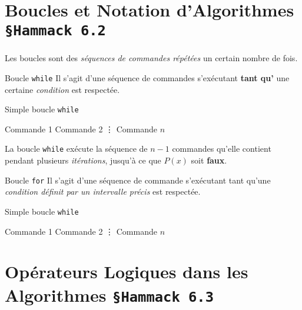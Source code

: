 \documentclass[16pt]{report}
\begin{document}
\begin{multicols*}{2}
            \section{Boucles et Notation d'Algorithmes \texttt{\small{\S Hammack 6.2}}}
                \paragraph{}
                Les boucles sont des \textit{séquences de commandes répétées} un certain nombre de fois. 

                \begin{Definitionx}{Boucle \texttt{while}}{}
                    Il s'agit d'une séquence de commandes s'exécutant \textbf{tant qu'} une 
                    certaine \textit{condition}
                    est respectée. 
                \end{Definitionx}


                \begin{algorithm}[H]
                    \caption{Simple boucle \texttt{while}}\label{alg:two}
                     {
                        Commande 1\; 
                        Commande 2\;
                        \vdots
                        Commande $n$ \;
                    }
                \end{algorithm}
                \noindent
                La boucle \texttt{while} exécute la séquence de $n - 1$ commandes qu'elle contient 
                pendant plusieurs \textit{itérations}, jusqu'à ce que $P(x)$ soit \textbf{faux}.    

            \begin{Definitionx}{Boucle \texttt{for}}{}
               Il s'agit d'une séquence de commande s'exécutant tant qu'une 
               \textit{condition définit par un intervalle précis} est respectée.   
            \end{Definitionx}
                \begin{algorithm}[H]
                    \caption{Simple boucle \texttt{while}}\label{alg:two2}
                        {
                        Commande 1\; 
                        Commande 2\;
                        \vdots
                        Commande $n$ \;
                    }
                \end{algorithm}
        \section{Opérateurs Logiques dans les Algorithmes \texttt{\small{\S Hammack 6.3}}}

\end{multicols*}
\end{document}

